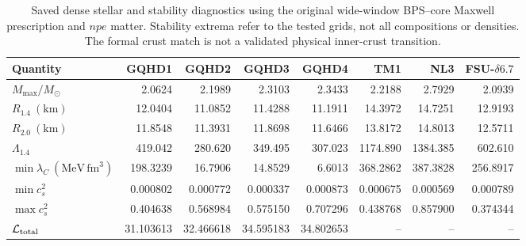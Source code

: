 \begin{table}[t]
\centering
\scriptsize
\caption{Saved dense stellar and stability diagnostics using the original wide-window BPS--core Maxwell prescription and $npe$ matter. Stability extrema refer to the tested grids, not all compositions or densities. The formal crust match is not a validated physical inner-crust transition.}
\label{tab:stellar_diagnostics}
\begin{tabular}{lrrrrrrr}
\hline
Quantity & GQHD1 & GQHD2 & GQHD3 & GQHD4 & TM1 & NL3 & FSU-$\delta6.7$ \\
\hline
$M_{\max}/M_\odot$ & 2.0624 & 2.1989 & 2.3103 & 2.3433 & 2.2188 & 2.7929 & 2.0939 \\
$R_{1.4}\ (\mathrm{km})$ & 12.0404 & 11.0852 & 11.4288 & 11.1911 & 14.3972 & 14.7251 & 12.9193 \\
$R_{2.0}\ (\mathrm{km})$ & 11.8548 & 11.3931 & 11.8698 & 11.6466 & 13.8172 & 14.8013 & 12.5711 \\
$\Lambda_{1.4}$ & 419.042 & 280.620 & 349.495 & 307.023 & 1174.890 & 1384.385 & 602.610 \\
$\min\lambda_C\ (\mathrm{MeV\,fm}^{3})$ & 198.3239 & 16.7906 & 14.8529 & 6.6013 & 368.2862 & 387.3828 & 256.8917 \\
$\min c_s^2$ & 0.000802 & 0.000772 & 0.000337 & 0.000873 & 0.000675 & 0.000569 & 0.000789 \\
$\max c_s^2$ & 0.404638 & 0.568984 & 0.575150 & 0.707296 & 0.438768 & 0.857900 & 0.374344 \\
$\mathcal L_{\rm total}$ & 31.103613 & 32.466618 & 34.595183 & 34.802653 & -- & -- & -- \\
\hline
\end{tabular}
\end{table}
